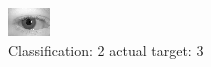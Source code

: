 \begin{figure}[h!]
\begin{center}
\includegraphics[width=0.60\columnwidth]{figures/ID514_class_2_target_3.png}
\end{center}
\caption{ Classification: 2 actual target: 3}
\label{fig:ID514_class_2_target_3}
\end{figure}
